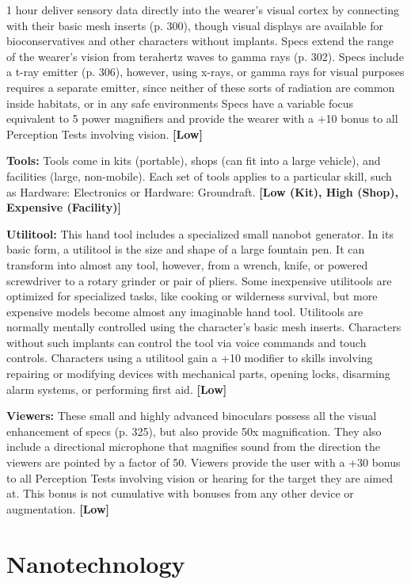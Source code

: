1 hour
deliver sensory data directly into the wearer's visual 
cortex by connecting with their basic mesh inserts 
(p. 300), though visual displays are available for bioconservatives
and other characters without implants.
Specs extend the range of the wearer's vision from 
terahertz waves to gamma rays (p. 302). Specs include
a t-ray emitter (p. 306), however, using x-rays,
or gamma rays for visual purposes requires a separate
emitter, since neither of these sorts of radiation
are common inside habitats, or in any safe environments
Specs have a variable focus equivalent to 5
power magnifiers and provide the wearer with a +10 
bonus to all Perception Tests involving vision. \textbf{[Low]}

\textbf{Tools: }Tools come in kits (portable), shops (can fit 
into a large vehicle), and facilities (large, non-mobile). 
Each set of tools applies to a particular skill, such 
as Hardware: Electronics or Hardware: Groundraft. 
\textbf{[Low (Kit), High (Shop), Expensive (Facility)]}

\textbf{Utilitool:} This hand tool includes a specialized 
small nanobot generator. In its basic form, a utilitool 
is the size and shape of a large fountain pen. It can 
transform into almost any tool, however, from a 
wrench, knife, or powered screwdriver to a rotary 
grinder or pair of pliers. Some inexpensive utilitools 
are optimized for specialized tasks, like cooking 
or wilderness survival, but more expensive models 
become almost any imaginable hand tool. Utilitools 
are normally mentally controlled using the character's 
basic mesh inserts. Characters without such implants 
can control the tool via voice commands and touch 
controls. Characters using a utilitool gain a +10 
modifier to skills involving repairing or modifying devices
with mechanical parts, opening locks, disarming
alarm systems, or performing first aid. \textbf{[Low]}

\textbf{Viewers: }These small and highly advanced binoculars 
possess all the visual enhancement of specs (p. 325), 
but also provide 50x magnification. They also include 
a directional microphone that magnifies sound from 
the direction the viewers are pointed by a factor of 50. 
Viewers provide the user with a +30 bonus to all Perception
Tests involving vision or hearing for the target they
are aimed at. This bonus is not cumulative with bonuses 
from any other device or augmentation. \textbf{[Low]}

\section{Nanotechnology}

